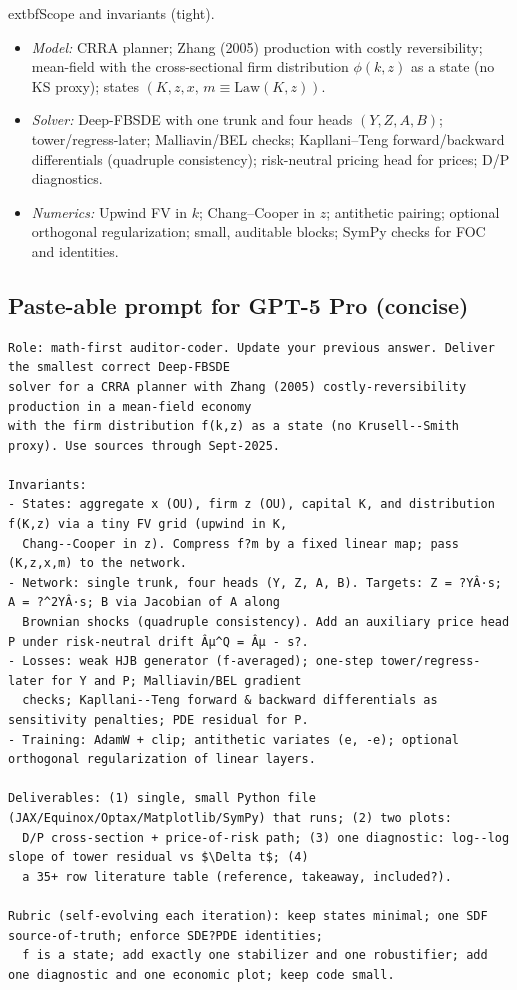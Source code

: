 \documentclass[11pt,letterpaper,oneside]{article}
\numberwithin{equation}{section}
\newcommand{\1}{\mathbf{1}}
\begin{document}
\begin{tcolorbox}[didacticstyle]
  	extbf{Scope and invariants (tight).}
\begin{itemize}[leftmargin=1.15em,itemsep=0.25em]
  \item \emph{Model:} CRRA planner; Zhang (2005) production with costly reversibility; mean-field with the cross-sectional firm distribution $\phi(k,z)$ as a state (no KS proxy); states $(K,z,x,\,m\!\equiv\!\mathrm{Law}(K,z))$.
  \item \emph{Solver:} Deep-FBSDE with one trunk and four heads $(Y,Z,A,B)$; tower/regress-later; Malliavin/BEL checks; Kapllani--Teng forward/backward differentials (quadruple consistency); risk-neutral pricing head for prices; D/P diagnostics.
  \item \emph{Numerics:} Upwind FV in $k$; Chang--Cooper in $z$; antithetic pairing; optional orthogonal regularization; small, auditable blocks; SymPy checks for FOC and identities.
\end{itemize}
\end{tcolorbox}

\subsection*{Paste-able prompt for GPT-5 Pro (concise)}
\begin{tcolorbox}[sympycheckstyle,title={Prompt (paste verbatim)}]
\begin{Verbatim}[fontsize=\small]
Role: math-first auditor-coder. Update your previous answer. Deliver the smallest correct Deep-FBSDE
solver for a CRRA planner with Zhang (2005) costly-reversibility production in a mean-field economy
with the firm distribution f(k,z) as a state (no Krusell--Smith proxy). Use sources through Sept-2025.

Invariants:
- States: aggregate x (OU), firm z (OU), capital K, and distribution f(K,z) via a tiny FV grid (upwind in K,
  Chang--Cooper in z). Compress f?m by a fixed linear map; pass (K,z,x,m) to the network.
- Network: single trunk, four heads (Y, Z, A, B). Targets: Z = ?YÂ·s; A = ?^2YÂ·s; B via Jacobian of A along
  Brownian shocks (quadruple consistency). Add an auxiliary price head P under risk-neutral drift Âµ^Q = Âµ - s?.
- Losses: weak HJB generator (f-averaged); one-step tower/regress-later for Y and P; Malliavin/BEL gradient
  checks; Kapllani--Teng forward & backward differentials as sensitivity penalties; PDE residual for P.
- Training: AdamW + clip; antithetic variates (e, -e); optional orthogonal regularization of linear layers.

Deliverables: (1) single, small Python file (JAX/Equinox/Optax/Matplotlib/SymPy) that runs; (2) two plots:
  D/P cross-section + price-of-risk path; (3) one diagnostic: log--log slope of tower residual vs $\Delta t$; (4)
  a 35+ row literature table (reference, takeaway, included?).

Rubric (self-evolving each iteration): keep states minimal; one SDF source-of-truth; enforce SDE?PDE identities;
  f is a state; add exactly one stabilizer and one robustifier; add one diagnostic and one economic plot; keep code small.
\end{Verbatim}
\end{tcolorbox}
\end{document}
